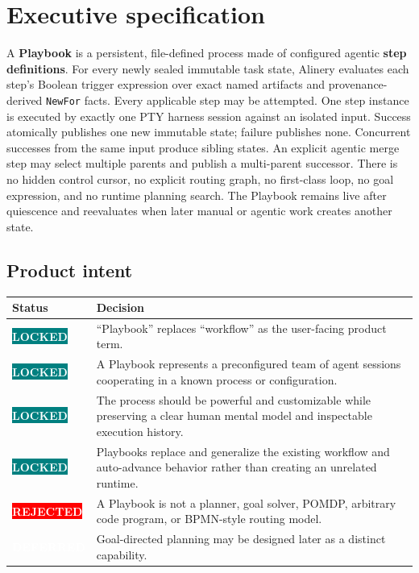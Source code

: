 \documentclass[11pt]{article}
\newcommand{\statuspill}[2]{%
  \begingroup\setlength{\fboxsep}{3pt}%
  \colorbox{#1}{\textcolor{white}{\sffamily\bfseries\scriptsize #2}}%
  \endgroup}
\newcommand{\Locked}{\statuspill{Teal}{LOCKED}}
\newcommand{\Deferred}{\statuspill{Muted}{DEFERRED}}
\newcommand{\Rejected}{\statuspill{Red}{REJECTED}}
\newcommand{\artifact}[1]{\texttt{#1}}
\newcommand{\term}[1]{\textbf{#1}}
\begin{document}
\tableofcontents
\clearpage

\section{Executive specification}

\begin{summarybox}
A \term{Playbook} is a persistent, file-defined process made of configured agentic \term{step definitions}. For every newly sealed immutable task state, Alinery evaluates each step's Boolean trigger expression over exact named artifacts and provenance-derived \artifact{NewFor} facts. Every applicable step may be attempted. One step instance is executed by exactly one PTY harness session against an isolated input. Success atomically publishes one new immutable state; failure publishes none. Concurrent successes from the same input produce sibling states. An explicit agentic merge step may select multiple parents and publish a multi-parent successor. There is no hidden control cursor, no explicit routing graph, no first-class loop, no goal expression, and no runtime planning search. The Playbook remains live after quiescence and reevaluates when later manual or agentic work creates another state.
\end{summarybox}

\subsection{Product intent}

\begin{tabularx}{\textwidth}{@{}L{1.05in}Y@{}}
\toprule
\textbf{Status} & \textbf{Decision} \\
\midrule
\Locked & ``Playbook'' replaces ``workflow'' as the user-facing product term. \\
\Locked & A Playbook represents a preconfigured team of agent sessions cooperating in a known process or configuration. \\
\Locked & The process should be powerful and customizable while preserving a clear human mental model and inspectable execution history. \\
\Locked & Playbooks replace and generalize the existing workflow and auto-advance behavior rather than creating an unrelated runtime. \\
\Rejected & A Playbook is not a planner, goal solver, POMDP, arbitrary code program, or BPMN-style routing model. \\
\Deferred & Goal-directed planning may be designed later as a distinct capability. \\
\bottomrule
\end{tabularx}
\end{document}
